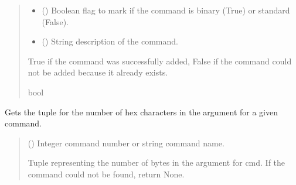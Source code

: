 \documentclass[letterpaper,10pt,english]{sphinxmanual}
\begin{document}
\begin{fulllineitems}
\begin{fulllineitems}
\begin{quote}
\begin{description}
\begin{itemize}
\item {} 
\sphinxAtStartPar
{} () \textendash{} Boolean flag to mark if the command is binary (True) or standard (False).

\item {} 
\sphinxAtStartPar
{} () \textendash{} String description of the command.

\end{itemize}

\sphinxAtStartPar
True if the command was successfully added, False if the command could not be added                 because it already exists.

\sphinxAtStartPar
bool

\end{description}\end{quote}

\end{fulllineitems}


\begin{fulllineitems}
\label{\detokenize{Morelia.Commands:Morelia.Commands.PodCommands.CommandSet.ArgumentHexChar}}
\pysigstartsignatures
{}
\pysigstopsignatures
\sphinxAtStartPar
Gets the tuple for the number of hex characters in the argument for a given command.
\begin{quote}\begin{description}
\sphinxAtStartPar
{} (\sphinxstyleliteralemphasis{\sphinxupquote{ | }}) \textendash{} Integer command number or string command name.

\sphinxAtStartPar
Tuple representing the number of bytes in the argument for cmd. If the                 command could not be found, return None.


\end{description}
\end{quote}
\end{fulllineitems}
\end{fulllineitems}
\end{document}

